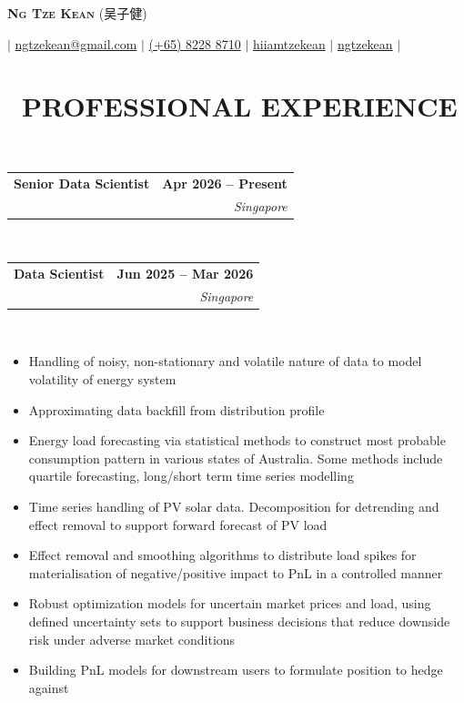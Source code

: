 \documentclass[10pt,a4paper]{article}
\makeatletter
\newcommand{\cvsectionfontsize}{11}       %
\newcommand{\cvtaglinefirstfontsize}{11}  %
\newcommand{\cvtaglinesecondfontsize}{10} %
\newcommand{\cvbulletfontsize}{10}        %
\newcommand{\cvsection}[3][.2em]{
  \vspace{-2.7em} %
  \section[#3]{\textbf{\scalebox{.68}{\faIcon{#2}}~\fontsize{\cvsectionfontsize}{\cvsectionfontsize}\selectfont\MakeUppercase{#3}}}
  \vspace{-1.8em}
  \noindent\makebox[\textwidth]{\rule{\textwidth}{0.4pt}}
  \\
  \vspace{#1} %
}
\newcommand{\cvtagline}[5][1em]{
  \vspace{-1em} %
  \noindent
  \begin{tabularx}{\textwidth}{@{}Xr@{}}
    {\fontsize{\cvtaglinefirstfontsize}{\cvtaglinefirstfontsize}\selectfont\textbf{#2}}
    &
    {\fontsize{\cvtaglinefirstfontsize}{\cvtaglinefirstfontsize}\selectfont\textbf{#3}}
    \\ %
    {\fontsize{\cvtaglinesecondfontsize}{\cvtaglinesecondfontsize}\selectfont{#4}}
    &
    {\fontsize{\cvtaglinesecondfontsize}{\cvtaglinesecondfontsize}\selectfont\textit{#5}}
    \\ %
  \end{tabularx}
  \\
  \vspace{#1} %
}
\newcommand{\cvbullets}[2][1em]{
  \vspace{-2.1em} %
  {\fontsize{\cvbulletfontsize}{\cvbulletfontsize}\selectfont
    \begin{itemize}[left=0pt,labelsep=1em]
        \setlength\itemsep{0.2em} %
        \setlength\labelwidth{1em} %
        \setlength\parskip{0pt} %
        #2
    \end{itemize}
  }
  \vspace{#1} %
}
\makeatother
\begin{document}
\pagestyle{empty}

\begin{center}
  {\bfseries\huge\scshape Ng Tze Kean} {\Large (吴子健)} \\
  \vspace{1em}

  $ | $
  \href{mailto:ngtzekean@gmail.com}{\faEnvelope \space ngtzekean@gmail.com}
  $ | $
  \href{tel:(+65)82288710}{\faPhone \space (+65) 8228 8710}
  $ | $
  \href{https://github.com/hiiamtzekean}{\faGithub \space hiiamtzekean}
  $ | $
  \href{https://www.linkedin.com/in/ngtzekean}{\faLinkedin \space ngtzekean}
  $ | $ \\
  \vspace{1em}
\end{center}

\cvsection{briefcase}{Professional Experience}

\cvtagline{Senior Data Scientist}{Apr 2026 -- Present}{Flo Energy Pte Ltd $
| $ Supervisor: Nils Terpstra [Head of Data \& Analytics]}{Singapore}

\cvtagline{Data Scientist}{Jun 2025 -- Mar 2026}{Flo Energy Pte Ltd $
| $ Supervisor: Nils Terpstra [Head of Data \& Analytics]}{Singapore}
\vspace{0.5em}
\cvbullets{
\item Handling of noisy, non-stationary and volatile nature of data
  to model volatility of energy system
\item Approximating data backfill from distribution profile
\item Energy load forecasting via statistical methods to construct
  most probable consumption pattern in various states of Australia.
  Some methods include quartile forecasting, long/short term time
  series modelling
\item Time series handling of PV solar data. Decomposition for
  detrending and effect removal to support forward forecast of PV load
\item Effect removal and smoothing algorithms to distribute load
  spikes for materialisation of negative/positive impact to PnL in a
  controlled manner
\item Robust optimization models for uncertain market prices and
  load, using defined uncertainty sets to support business decisions
  that reduce downside risk under adverse market conditions
\item Building PnL models for downstream users to formulate position
  to hedge against
}
\end{document}
